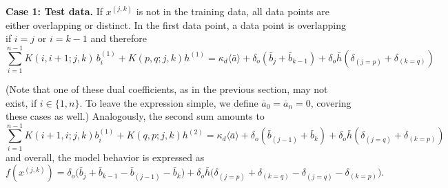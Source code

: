 \documentclass{article}
\theoremstyle{plain}
\begin{document}
\bigskip

\textbf{Case 1: Test data.} \quad 
If $x^{(j,k)}$ is not in the training data, all data points are either overlapping or distinct. 
In the first data point, a data point is overlapping if $i=j$ or $i=k-1$ and therefore
\begin{equation}
\sum_{i=1}^{n-1} K(i,i+1; j,k)\, b_i^{(1)} + K(p,q;j,k)h^{(1)} 
= \kappa_d \langle \bar{a} \rangle + \delta_o(\bar{b}_j + \bar{b}_{k-1}) + \delta_o \bar{h}(\delta_{(j = p)} + \delta_{(k = q)})
\tag{S63}
\end{equation}

(Note that one of these dual coefficients, as in the previous section, may not exist, if $i \in \{1,n\}$. 
To leave the expression simple, we define $\overline{a}_0 = \overline{a}_n = 0$, covering these cases as well.)
Analogously, the second sum amounts to
\begin{equation}
\sum_{i=1}^{n-1} K(i+1,i; j,k) b_i^{(1)} + K(q,p;j,k)h^{(2)} 
= \kappa_d \langle \bar{a} \rangle + \delta_o(\bar{b}_{(j-1)} + \bar{b}_k) + \delta_o \bar{h}(\delta_{(j = q)} + \delta_{(k = p)})
\tag{S64}
\end{equation}
and overall, the model behavior is expressed as
\begin{equation}
f(x^{(j,k)}) 
=  \delta_o \bigl(\bar{b}_j + \bar{b}_{k-1} - \bar{b}_{(j-1)} - \bar{b}_k\bigr) + \delta_o \bar{h} \bigl(\delta_{(j=p)} + \delta_{(k=q)} - \delta_{(j=q)} - \delta_{(k=p)}\bigr).
\tag{S65}
\end{equation}

\bigskip
\end{document}
